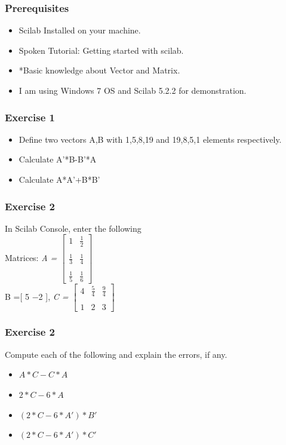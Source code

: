 \documentclass[17pt]{beamer}
\begin{document}
\begin{frame}[fragile]
\frametitle{Prerequisites}
\begin{itemize} [<+-|alert@+>]
\item Scilab Installed on your machine. 
\item Spoken Tutorial: Getting started with scilab.
\item *Basic knowledge about Vector and Matrix.
\item I am using Windows 7 OS and Scilab 5.2.2 for demonstration.
\end{itemize}
\end{frame}

\begin{frame}[fragile]
\frametitle{Exercise 1}
\begin{itemize}
\item Define two vectors A,B with 1,5,8,19 and 19,8,5,1 elements respectively.
\item Calculate A'*B-B'*A
\item Calculate A*A'+B*B'
\end{itemize}
\end{frame}

\begin{frame}[fragile]
\frametitle{Exercise 2}
In Scilab Console, enter the following\\
Matrices:
\textsl{A = $\left[
               \begin{array}{cc}
                 1 &  \frac{1}{2}   \\ \\
                 \frac{1}{3} &  \frac{1}{4}  \\ \\
                 \frac{1}{5} & \frac{1}{6} 
              \end{array}
             \right]$ }\\
B =[ 5 −2 ],
\textsl{C = $\left[
               \begin{array}{ccc}
                 4 &  \frac{5}{4}  & \frac{9}{4}   \\ \\
                 1 & 2 & 3  
                \end{array}
             \right]$ }\\
             
\end{frame} 

\begin{frame}[fragile]
\frametitle{Exercise 2}             
Compute each of the following and explain the errors, if any.
\begin{itemize}
\item $A*C-C*A$
\item $2*C-6*A$
\item $(2*C-6*A')*B'$
\item $(2*C-6*A')*C'$
\end{itemize}
\end{frame}  
\end{document}
